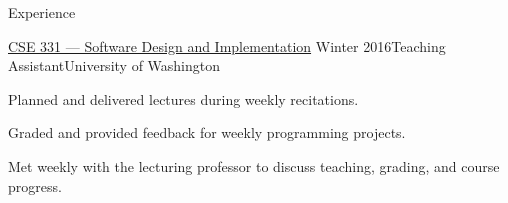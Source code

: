 \documentclass{resume} %
\begin{document}
\begin{rSection}{Experience}
  \begin{rSubsection}{\href{https://courses.cs.washington.edu/courses/cse331/16wi/}{CSE 331 --- Software Design and Implementation}}
    {Winter 2016}{Teaching Assistant}{University of Washington}
  \item Planned and delivered lectures during weekly recitations.
  \item Graded and provided feedback for weekly programming projects.
  \item Met weekly with the lecturing professor to discuss teaching, grading, and course progress.
  \end{rSubsection}
  
\end{rSection}






\end{document}
